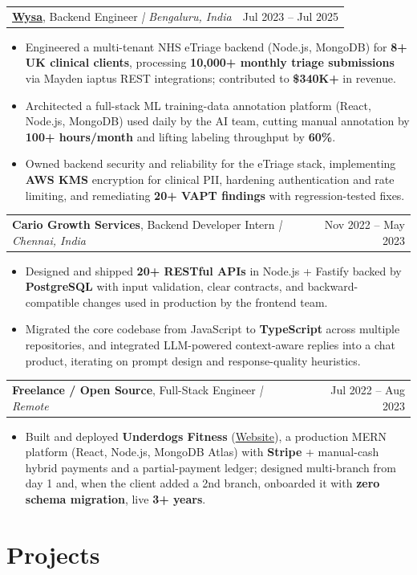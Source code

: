 \documentclass[letterpaper,11pt]{article}
\makeatletter
\newcommand{\expItem}[4]{%
  \vspace{2pt}
  \begin{tabular*}{\textwidth}{@{}l@{\extracolsep{\fill}}r@{}}
    \textbf{#1}, #2 \textit{| #3} & #4 \\
  \end{tabular*}\par\vspace{-3pt}
}
\makeatother
\begin{document}
\expItem{\href{https://www.wysa.io}{Wysa}}{Backend Engineer}{Bengaluru, India}{Jul 2023 -- Jul 2025}
\begin{itemize}
  \item Engineered a multi-tenant NHS eTriage backend (Node.js, MongoDB) for \textbf{8+ UK clinical clients}, processing \textbf{10{,}000+ monthly triage submissions} via Mayden iaptus REST integrations; contributed to \textbf{\$340K+} in revenue.
  \item Architected a full-stack ML training-data annotation platform (React, Node.js, MongoDB) used daily by the AI team, cutting manual annotation by \textbf{100+ hours/month} and lifting labeling throughput by \textbf{60\%}.
  \item Owned backend security and reliability for the eTriage stack, implementing \textbf{AWS KMS} encryption for clinical PII, hardening authentication and rate limiting, and remediating \textbf{20+ VAPT findings} with regression-tested fixes.
\end{itemize}

\expItem{Cario Growth Services}{Backend Developer Intern}{Chennai, India}{Nov 2022 -- May 2023}
\begin{itemize}
  \item Designed and shipped \textbf{20+ RESTful APIs} in Node.js + Fastify backed by \textbf{PostgreSQL} with input validation, clear contracts, and backward-compatible changes used in production by the frontend team.
  \item Migrated the core codebase from JavaScript to \textbf{TypeScript} across multiple repositories, and integrated LLM-powered context-aware replies into a chat product, iterating on prompt design and response-quality heuristics.
\end{itemize}

\expItem{Freelance / Open Source}{Full-Stack Engineer}{Remote}{Jul 2022 -- Aug 2023}
\begin{itemize}
  \item Built and deployed \textbf{Underdogs Fitness} {\normalfont\small(\href{https://www.underdogsfitness.in/}{Website})}, a production MERN platform (React, Node.js, MongoDB Atlas) with \textbf{Stripe} + manual-cash hybrid payments and a partial-payment ledger; designed multi-branch from day 1 and, when the client added a 2nd branch, onboarded it with \textbf{zero schema migration}, live \textbf{3+ years}.
\end{itemize}

\section{Projects}
\end{document}
